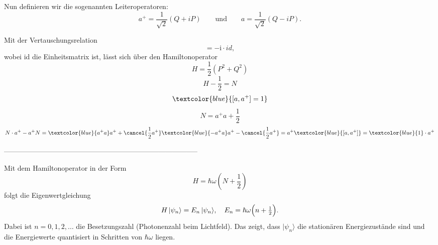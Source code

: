Nun definieren wir die sogenannten Leiteroperatoren:
\[
a^{+} = \frac{1}{\sqrt{2}}(Q + iP)
\qquad\text{und}\qquad
a = \frac{1}{\sqrt{2}}(Q - iP).
\]

Mit der Vertauschungsrelation
\begin{equation}
	[P,Q] = -\mathrm{i} \cdot id,
\end{equation}
wobei id die Einheitsmatrix ist, lässt sich über den Hamiltonoperator %
\begin{equation}
	H = \frac{1}{2}(P^2+Q^2)
\end{equation}
\begin{equation}
	H - \frac{1}{2} = N
\end{equation}
\begin{equation}
	\textcolor{blue}{[a, a^+] = 1}
\end{equation}
\begin{equation}
	N = a^+a + \frac{1}{2}
\end{equation}
\begin{equation}
	N\cdot a^+ - a^+N 
	= \textcolor{blue}{a^+a}a^+ + \cancel{\frac{1}{2}a^+} \textcolor{blue}{-a^+a}a^+ - \cancel{\frac{1}{2}a^+}
	= a^+\textcolor{blue}{[a, a^+]}
	= \textcolor{blue}{1}\cdot a^+
\end{equation}




-----------------------------------------------------------------------------------

Mit dem Hamiltonoperator in der Form
\begin{equation}
	H = \hbar\omega(N + \frac{1}{2})
\end{equation}
folgt die Eigenwertgleichung
\begin{equation}
	H\,|\psi_n\rangle = E_n\,|\psi_n\rangle,
  	\quad
	E_n = \hbar\omega\Bigl(n + \tfrac12\Bigr).
\end{equation}
Dabei ist $n = 0,1,2,\dots$ die Besetzungszahl (Photonenzahl beim Lichtfeld).
Das zeigt, dass $|\psi_n\rangle$ die stationären Energiezustände sind und die Energiewerte quantisiert in Schritten von $\hbar\omega$ liegen.

